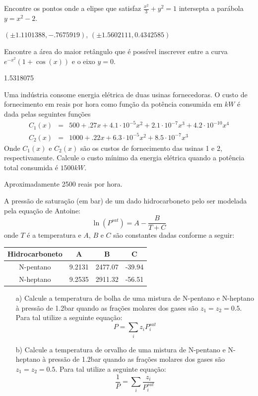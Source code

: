 \documentclass[main.tex]{subfiles}
\begin{document}
\begin{Exercise} Encontre os pontos onde a elipse que satisfaz $\frac{x^2}{3}+y^2=1$ intersepta a parábola $y=x^2-2$.
\end{Exercise}
\begin{Answer}
$\left(\pm 1.1101388,-.7675919\right)$, $\left(\pm 1.5602111,0.4342585\right)$
\end{Answer}

\begin{Exercise}[title= Otimização] Encontre a área do maior retângulo que é possível inscrever entre a curva $e^{-x^2}\left(1+\cos(x)\right)$ e o eixo $y=0$.
\end{Exercise}
\begin{Answer}
1.5318075
\end{Answer}


\begin{Exercise}[title=Otimização] \label{usinas} Uma indústria consome energia elétrica de duas usinas fornecedoras. O custo de fornecimento em reais por hora como função da potência consumida em $kW$ é dada pelas seguintes funções
\begin{eqnarray*}
C_1(x)&=& 500+.27 x + 4.1\cdot 10^{-5}x^2 +2.1\cdot 10^{-7}x^3+4.2\cdot 10^{-10}x^4 \\
C_2(x)&=& 1000+.22 x + 6.3\cdot 10^{-5}x^2 +8.5\cdot 10^{-7}x^3
\end{eqnarray*}
Onde $C_1(x)$ e $C_2(x)$ são os custos de fornecimento das usinas 1 e 2, respectivamente. Calcule o custo mínimo da energia elétrica quando a potência total consumida é  $1500kW$.

\end{Exercise}
\begin{Answer}
 Aproximadamente 2500 reais por hora.
\end{Answer}

\begin{Exercise}[title= Termodinâmica] A pressão de saturação (em bar) de um dado hidrocarboneto pelo ser modelada pela equação de Antoine:
$$\ln\left(P^{sat}\right)=A-\frac{B}{T+C}$$
onde $T$ é a temperatura e $A$, $B$ e $C$ são constantes dadas conforme a seguir:

\begin{tabular}{|c|c|c|c|}
\hline
Hidrocarboneto&A&B&C\\
\hline
N-pentano & 9.2131 & 2477.07 & -39.94 \\
\hline
N-heptano & 9.2535 &2911.32 &-56.51 \\
\hline
\end{tabular}
\begin{itemize}
\item[a)] Calcule a temperatura de bolha de uma mistura de N-pentano e N-heptano à pressão de 1.2bar quando as frações molares  dos gases são  $z_1=z_2=0.5$. Para tal utilize a seguinte equação:
$$P=\sum_i z_i P_i^{sat}$$
\item[b)] Calcule a temperatura de orvalho de uma mistura de N-pentano e N-heptano à pressão de 1.2bar quando as frações molares  dos gases são  $z_1=z_2=0.5$. Para tal utilize a seguinte equação:
$$\frac{1}{P}=\sum_i \frac{z_i}{P_i^{sat}}$$
\end{itemize}
\end{Exercise}
\end{document}
